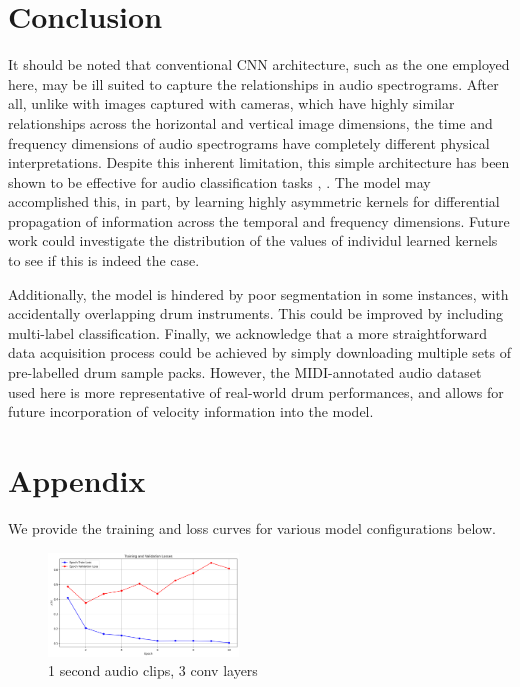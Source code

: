 \documentclass[twocolumn]{article}
\begin{document}
\section{Conclusion}

It should be noted that conventional CNN architecture, such as the one employed here, may be ill suited to capture the relationships in audio spectrograms.
After all, unlike with images captured with cameras, which have highly similar relationships across the horizontal and vertical image dimensions, the time and frequency dimensions of audio spectrograms have completely different physical interpretations.
Despite this inherent limitation, this simple architecture has been shown to be effective for audio classification tasks \cite{piczak_environmental_2015}, \cite{hershey_cnn_2017}.
The model may accomplished this, in part, by learning highly asymmetric kernels for differential propagation of information across the temporal and frequency dimensions.
Future work could investigate the distribution of the values of individul learned kernels to see if this is indeed the case.

Additionally, the model is hindered by poor segmentation in some instances, with accidentally overlapping drum instruments.
This could be improved by including multi-label classification.
Finally, we acknowledge that a more straightforward data acquisition process could be achieved by simply downloading multiple sets of pre-labelled drum sample packs.
However, the MIDI-annotated audio dataset used here is more representative of real-world drum performances, and allows for future incorporation of velocity information into the model.

\section{Appendix}

We provide the training and loss curves for various model configurations below.
\begin{figure}
\centering
\includegraphics[width=0.45\textwidth]{figures/loss_plot_1s_3conv.png}
\caption{1 second audio clips, 3 conv layers}
\label{fig:1s_3conf}
\end{figure}
\end{document}
